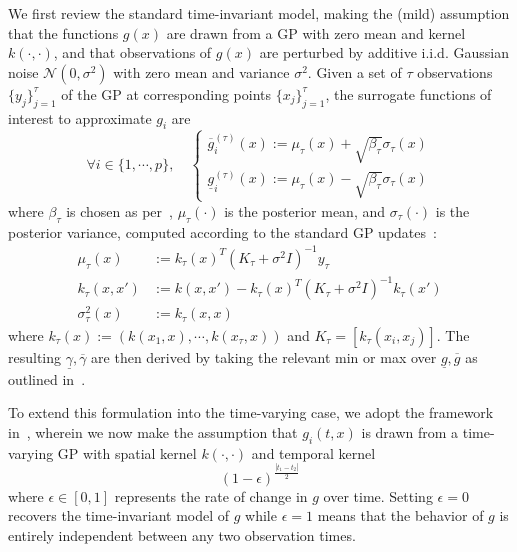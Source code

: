 \documentclass{IEEEojcsys}
\newcommand{\ul}{\underline}
\newcommand{\ol}{\overline}
\begin{document}
We first review the standard time-invariant model, making the (mild) assumption that the functions $g(x)$ are drawn from a \ac{GP} with zero mean and kernel $k(\cdot,\cdot)$, and that observations of $g(x)$ are perturbed by additive i.i.d. Gaussian noise $\mathcal{N}(0,\sigma^2)$ with zero mean and variance $\sigma^2$.
Given a set of $\tau$ observations $\{y_j\}_{j=1}^\tau$ of the \ac{GP} at corresponding points $\{x_j\}_{j=1}^\tau$, the surrogate functions of interest to approximate $g_i$ are 
\begin{equation}
    \forall i\in\{1,\cdots,p\}, \quad
    \begin{cases}
    \ol{g}_{i}^{(\tau)}(x) := \mu_\tau(x) + \sqrt{\beta_\tau}\sigma_{\tau}(x)\\
    \ul{g}_i^{(\tau)}(x) := \mu_\tau(x) - \sqrt{\beta_\tau}\sigma_{\tau}(x)
    \end{cases}
    \label{eq:GP-UCB}
\end{equation}
where $\beta_\tau$ is chosen as per~\cite[Theorem 7]{caoMMGPOJCSYS},
$\mu_\tau(\cdot)$ is the posterior mean, and $\sigma_\tau(\cdot)$ is the posterior variance, computed according to the standard \ac{GP} updates~\cite{Rasmussen2006}:
\begin{align}
    \mu_\tau(x) &:= k_\tau(x)^T(K_\tau+\sigma^2 I)^{-1}y_\tau\\
    k_\tau(x,x') &:= k(x,x')-k_\tau(x)^T(K_\tau+\sigma^2 I)^{-1}k_\tau(x')\\
    \sigma_\tau^2(x) &:= k_\tau(x,x)
\end{align}
where $k_\tau(x):= (k(x_1,x),\cdots,k(x_\tau,x))$ and $K_\tau=\left[k_\tau(x_i,x_j)\right]$. The resulting $\ul{\gamma}, \ol{\gamma}$ are then derived by taking the relevant min or max over $\ul{g}, \ol{g}$ as outlined in~\cite[Theorem 7]{caoMMGPOJCSYS}.

To extend this formulation into the time-varying case, we adopt the framework in~\cite{bogunovicTVGP}, wherein we now make the assumption that $g_i(t, x)$ is drawn from a time-varying \ac{GP} with spatial kernel $k(\cdot, \cdot)$ and temporal kernel
\begin{equation}
    (1-\epsilon)^\frac{|t_1-t_2|}{2}
    \label{eq:time_kernel}
\end{equation}
where $\epsilon \in [0, 1]$ represents the rate of change in $g$ over time. Setting $\epsilon=0$ recovers the time-invariant model of $g$ while $\epsilon = 1$ means that the behavior of $g$ is entirely independent between any two observation times.
\end{document}
